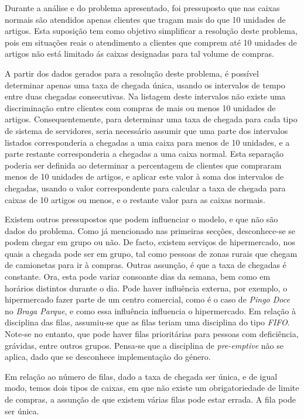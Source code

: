 Durante a análise e do problema apresentado, foi pressuposto que nas caixas
normais são atendidos apenas clientes que tragam mais do que 10 unidades de
artigos. Esta suposição tem como objetivo simplificar a resolução deste
problema, pois em situações reais o atendimento a clientes que comprem até 10
unidades de artigos não está limitado ás caixas designadas para tal volume de
compras. 

A partir dos dados gerados para a resolução deste problema, é possível
determinar apenas uma taxa de chegada única, usando os intervalos de tempo entre
duas chegadas consecutivas. Na listagem deste intervalos não existe uma
discriminação entre clientes com compras de mais ou menos 10 unidades de
artigos. Consequentemente, para determinar uma taxa de chegada para cada tipo de
sistema de servidores, seria necessário assumir que uma parte dos intervalos
listados corresponderia a chegadas a uma caixa para menos de 10 unidades,
e a parte restante corresponderia a chegadas a uma caixa normal. Esta separação
poderia ser definida ao determinar a percentagem de clientes que compraram menos
de 10 unidades de artigos, e aplicar este valor à soma dos intervalos de
chegadas, usando o valor correspondente para calcular a taxa de chegada para
caixas de 10 artigos ou menos, e o restante valor para as caixas normais.


Existem outros pressupostos que podem influenciar o modelo, e que não são dados do
problema. Como já mencionado nas primeiras secções, desconhece-se se podem
chegar em grupo ou não. De facto, existem serviços de hipermercado, nos quais
a chegada pode ser em grupo, tal como pessoas de zonas rurais que chegam de
camionetas para ir à compras. Outras assunção, é que a taxa de chegadas
é constante. Ora, esta pode variar consoante dias da semana, bem como em
horários distintos durante o dia. Pode haver influência externa, por exemplo,
o hipermercado fazer parte de um centro comercial, como é o caso de \emph{Pingo
Doce} no \emph{Braga Parque}, e como essa influência influencia o hipermercado.  
Em relação à disciplina das filas, assumiu-se que as filas teriam uma disciplina
do tipo \emph{FIFO}. Note-se no entanto, que pode haver filas prioritárias para
pessoas com deficiência, grávidas, entre outros grupos. Pensa-se que
a disciplina de \emph{pre-emptive} não se aplica, dado que se desconhece
implementação do género.
 
Em relação ao número de filas, dado a taxa de chegada ser única, e de igual
modo, temos dois tipos de caixas, em que não existe um obrigatoriedade de limite
de compras, a assunção de que existem várias filas pode estar errada. A fila
pode ser única.

